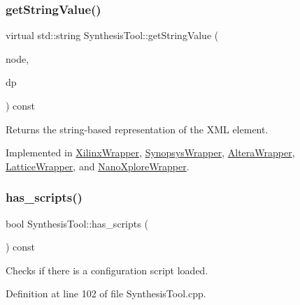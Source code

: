 \subsubsection{\texorpdfstring{get\+String\+Value()}{getStringValue()}}
{\footnotesize\ttfamily virtual std\+::string Synthesis\+Tool\+::get\+String\+Value (\begin{DoxyParamCaption}\item[{const \hyperlink{xml__script__command_8hpp_a1fe3d50ade66bc35e41be9b68bbbcd02}{xml\+\_\+script\+\_\+node\+\_\+t\+Ref}}]{node,  }\item[{const \hyperlink{DesignParameters_8hpp_ae36bb1c4c9150d0eeecfe1f96f42d157}{Design\+Parameters\+Ref} \&}]{dp }\end{DoxyParamCaption}) const\hspace{0.3cm}{\ttfamily [pure virtual]}}



Returns the string-\/based representation of the X\+ML element. 



Implemented in \hyperlink{classXilinxWrapper_a1a3f3f256c4552c913ad26396a7f3bab}{Xilinx\+Wrapper}, \hyperlink{classSynopsysWrapper_a2466100fbd55e3ec1c466841d35aa2d9}{Synopsys\+Wrapper}, \hyperlink{classAlteraWrapper_a3a0bb0f3531b35bf4e9b615042b00e97}{Altera\+Wrapper}, \hyperlink{classLatticeWrapper_a93a496eef88f096b8405503966a15a2d}{Lattice\+Wrapper}, and \hyperlink{classNanoXploreWrapper_a88615cca1531c82e07e1ed0d4cc9a47e}{Nano\+Xplore\+Wrapper}.

\mbox{\label{classSynthesisTool_a3a0d25063c6aa0ddb5febc1babe896ac}} 
\subsubsection{\texorpdfstring{has\+\_\+scripts()}{has\_scripts()}}
{\footnotesize\ttfamily bool Synthesis\+Tool\+::has\+\_\+scripts (\begin{DoxyParamCaption}{ }\end{DoxyParamCaption}) const}



Checks if there is a configuration script loaded. 



Definition at line 102 of file Synthesis\+Tool.\+cpp.



